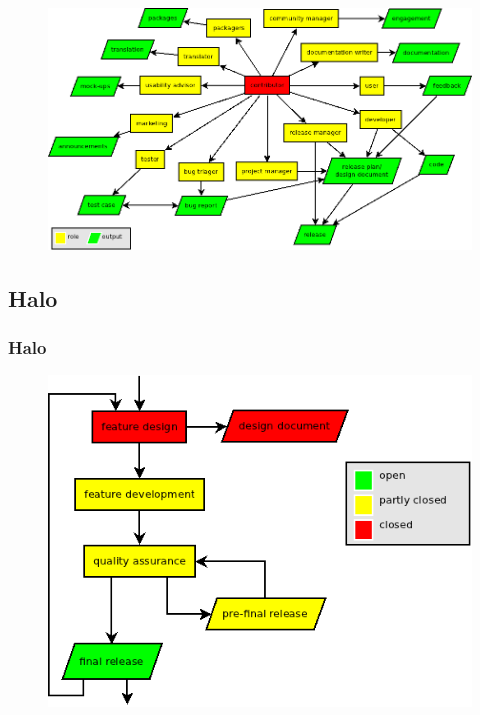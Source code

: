 \documentclass{beamer}
\begin{document}
\begin{frame}
\begin{figure}[h!]
 \centering
 \includegraphics[scale=0.35,keepaspectratio=true]{./ontology.png}
\end{figure}
\end{frame}

\subsection{Halo}

\begin{frame}
\frametitle{Halo}
\begin{figure}[h!]
 \centering
 \includegraphics[scale=0.5,keepaspectratio=true]{./ReleaseProcessHalo.png}
\end{figure}
\end{frame}
\end{document}
